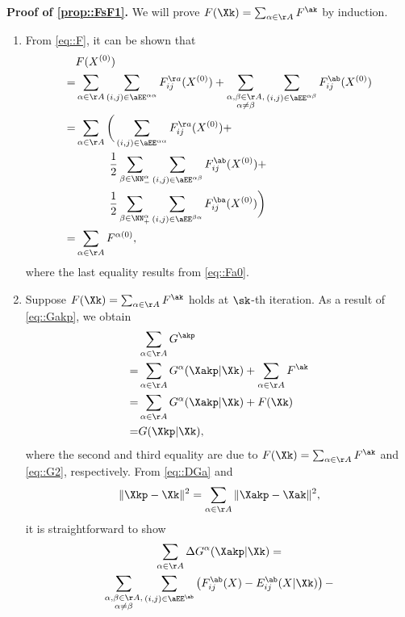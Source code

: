 \noindent\textbf{Proof of \ref{prop::FsF1}.\;} We will prove $F(\Xk)=\sum_{\alpha\in\AA} F^{\ak}$ by induction.
\begin{enumerate}[leftmargin=0.45cm]
\item From \cref{eq::F}, it can be shown that
\begin{align}
&F(X^{(0)})\nonumber\\
=&\sum_{\alpha\in\AA}\sum_{(i,j)\in \aEE^{\alpha\alpha}}F_{ij}^{\aa}(X^{(0)})+
\sum_{\substack{\alpha,\beta\in\AA,\\\alpha\neq \beta}}\sum_{(i,j)\in \aEE^{\alpha\beta}} F_{ij}^{\ab}(X^{(0)})\nonumber\\
=&\sum_{\alpha\in\AA}\bigg(\sum_{(i,j)\in \aEE^{\alpha\alpha}}F_{ij}^{\aa}(X^{(0)}) +\nonumber\\
 &\quad\quad\quad\frac{1}{2}\sum_{\beta\in\NN_-^{\alpha}}\sum_{(i,j)\in \aEE^{\alpha\beta}} F_{ij}^{\ab}(X^{(0)})+\label{eq::FF0}\\
 &\quad\quad\quad\frac{1}{2}\sum_{\beta\in\NN_+^{\alpha}}\sum_{(i,j)\in \aEE^{\beta\alpha}} F_{ij}^{\ba}(X^{(0)})\bigg)\nonumber\\
=&\sum_{\alpha\in\AA} F^{\alpha(0)},\nonumber
\end{align}
where the last equality results from \cref{eq::Fa0}.
\vspace{0.25em}
\item Suppose $F(\Xk)=\sum_{\alpha\in\AA} F^{\ak}$ holds at $\sk$-th iteration. As a result of \cref{eq::Gakp}, we obtain
\begin{equation}\label{eq::GGa}
\begin{aligned}
&\sum_{\alpha\in\AA}G^{\akp}\\
=&\sum_{\alpha\in\AA} G^\alpha(\Xakp|\Xk) + \sum_{\alpha\in\AA}F^{\ak}\\
=&\sum_{\alpha\in\AA} G^\alpha(\Xakp|\Xk) + F(\Xk)\\
=& G(\Xkp|\Xk),
\end{aligned}
\end{equation}
where the second and third equality are due to $F(\Xk)=\sum_{\alpha\in\AA} F^{\ak}$ and \cref{eq::G2}, respectively. From \cref{eq::DGa} and
\begin{equation}
\nonumber
\|\Xkp-\Xk\|^2=\sum_{\alpha\in\AA}\|\Xakp-\Xak\|^2,
\end{equation}
it is straightforward to show
\begin{multline}\label{eq::DG}
\sum_{\alpha\in\AA} \Delta G^{\alpha}(\Xakp|\Xk)=\\
\sum_{\substack{\alpha,\beta\in\AA,\\\alpha\neq \beta}}\sum_{(i,j)\in \aEE^{\ab}} \left(F_{ij}^{\ab}(X)-E_{ij}^{\ab}(X|\Xk)\right)-\\

\end{multline}
\end{enumerate}
